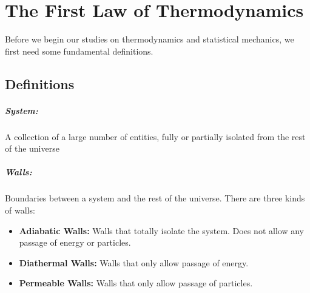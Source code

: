 \chapter{The First Law of Thermodynamics}
\label{ch:Chapter1}
    Before we begin our studies on thermodynamics and statistical mechanics, we first need some fundamental definitions.
\section{Definitions}
\label{sec:1.1Definitions}
    \paragraph{System:}A collection of a large number of entities, fully or partially isolated from the rest of the universe
    \paragraph{Walls:}Boundaries between a system and the rest of the universe.
    There are three kinds of walls:
    \begin{itemize}
        \item \textbf{Adiabatic Walls:} Walls that totally isolate the system. Does not allow any passage of energy or particles.
        \item \textbf{Diathermal Walls:} Walls that only allow passage of energy.
        \item \textbf{Permeable Walls:} Walls that only allow passage of particles.
    \end{itemize}
